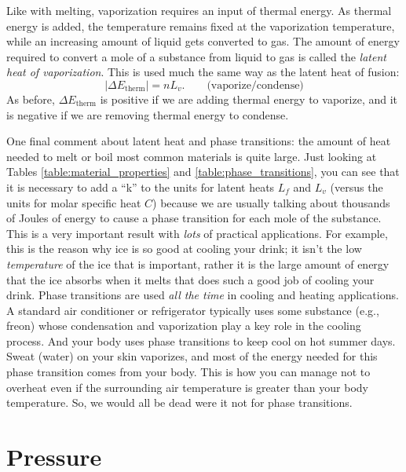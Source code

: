 Like with melting, vaporization requires an input of thermal energy.
As thermal energy is added, the temperature remains fixed at the
vaporization temperature, while an increasing amount of liquid gets
converted to gas.  The amount of energy required to convert a mole of
a substance from liquid to gas is called the \textit{latent heat of
  vaporization}.  This is used much the same way as the latent heat of
fusion:
\begin{equation}
  |\Delta E_\text{therm}| = nL_v. \qquad\text{(vaporize/condense)}
\end{equation}
As before, $\Delta E_\text{therm}$ is positive if we are adding
thermal energy to vaporize, and it is negative if we are removing
thermal energy to condense.


One final comment about latent heat and phase transitions: the amount
of heat needed to melt or boil most common materials is quite large.
Just looking at Tables \ref{table:material_properties} and
\ref{table:phase_transitions}, you can see that it is necessary to add a
``k'' to the units for latent heats $L_f$ and $L_v$ (versus the units
for molar specific heat $C$) because we are usually talking about
thousands of Joules of energy to cause a phase transition for each
mole of the substance.  This is a very important result with \textit{  lots} of practical applications.  For example, this is the reason
why ice is so good at cooling your drink; it isn't the low \emph{temperature} of the ice that is important, rather it is the large
amount of energy that the ice absorbs when it melts that does such a
good job of cooling your drink.  Phase transitions are used \emph{all
  the time} in cooling and heating applications.  A standard air
conditioner or refrigerator typically uses some substance (e.g.,
freon) whose condensation and vaporization play a key role in the
cooling process.  And your body uses phase transitions to keep cool on
hot summer days.  Sweat (water) on your skin vaporizes, and most of
the energy needed for this phase transition comes from your body.
This is how you can manage not to overheat even if the surrounding air
temperature is greater than your body temperature.  So, we would all
be dead were it not for phase transitions.

\section{Pressure}

